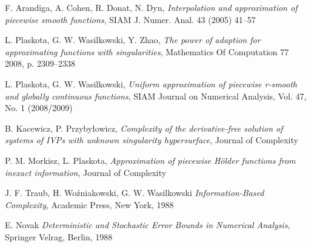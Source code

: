 \documentclass[oik, pdftex, man]{mgrwms}
\begin{document}
\mgrclosechapter



%  
\begin{thebibliography}{88}

    F. Arandiga, A. Cohen, R. Donat, N. Dyn,
    \emph{Interpolation and approximation of piecewise smooth functions}, SIAM J. Numer. Anal. 43 (2005) 41–57

    L. Plaskota, G. W. Wasilkowski, Y. Zhao, 
    \emph{The power of adaption for approximating functions with singularities}, Mathematics Of Computation 77
    2008, p. 2309–2338

    L. Plaskota, G. W. Wasilkowski, 
    \emph{Uniform approximation of piecewise r-smooth and globally continuous functions}, SIAM Journal on Numerical
    Analysis, Vol. 47, No. 1 (2008/2009)

    B. Kacewicz, P. Przybyłowicz, 
    \emph{Complexity of the derivative-free solution of
    systems of IVPs with unknown singularity hypersurface}, Journal of Complexity
    
    P. M. Morkisz, L. Plaskota, 
    \emph{Approximation of piecewise Hölder functions from inexact information}, Journal of Complexity

    J. F. Traub, H. Woźniakowski, G. W. Wasilkowski
    \emph{Information-Based Complexity}, Academic Press, New York, 1988

    E. Novak
    \emph{Deterministic and Stochastic Error Bounds in Numerical Analysis}, Springer Velrag, Berlin, 1988

\end{thebibliography}
\end{document}
